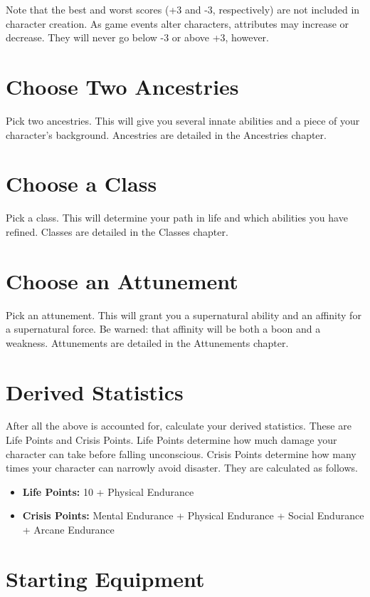 \begin{multicols}{2}
Note that the best and worst scores (+3 and -3, respectively) are not 
included in character creation. As game events alter characters, 
attributes may increase or decrease. They will never go below -3 or
above +3, however.

\section{Choose Two Ancestries}

Pick two ancestries. This will give you several innate abilities 
and a piece of your character's background. Ancestries are detailed
in the Ancestries chapter.

\section{Choose a Class}

Pick a class. This will determine your path in life and which 
abilities you have refined. Classes are detailed in the Classes
chapter.

\section{Choose an Attunement}

Pick an attunement. This will grant you a supernatural ability 
and an affinity for a supernatural force. Be warned: that 
affinity will be both a boon and a weakness. Attunements are
detailed in the Attunements chapter.

\section{Derived Statistics}

After all the above is accounted for, calculate your derived 
statistics. These are Life Points and Crisis Points. Life Points 
determine how much damage your character can take before falling 
unconscious. Crisis Points determine how many times your character 
can narrowly avoid disaster. They are calculated as follows.

\begin{itemize}
    \item \textbf{Life Points:} 10 + Physical Endurance
    \item \textbf{Crisis Points:} Mental Endurance + Physical Endurance + Social Endurance + Arcane Endurance
\end{itemize}

\section{Starting Equipment}


\end{multicols}
